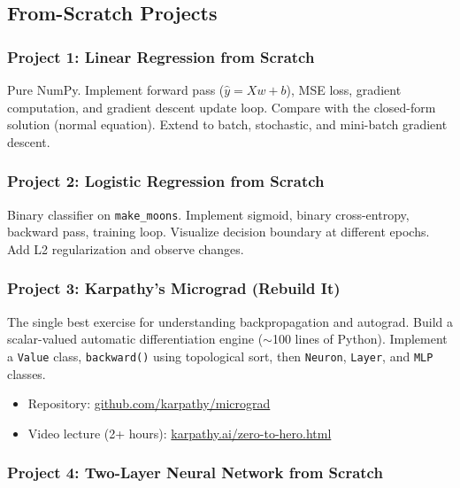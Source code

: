 \documentclass[11pt,letterpaper]{article}
\begin{document}
\subsection{From-Scratch Projects}

\subsubsection{Project 1: Linear Regression from Scratch}

Pure NumPy. Implement forward pass ($\hat{y} = Xw + b$), MSE loss, gradient computation, and gradient descent update loop. Compare with the closed-form solution (normal equation). Extend to batch, stochastic, and mini-batch gradient descent.

\subsubsection{Project 2: Logistic Regression from Scratch}

Binary classifier on \texttt{make\_moons}. Implement sigmoid, binary cross-entropy, backward pass, training loop. Visualize decision boundary at different epochs. Add L2 regularization and observe changes.

\subsubsection{Project 3: Karpathy's Micrograd (Rebuild It)}

The single best exercise for understanding backpropagation and autograd. Build a scalar-valued automatic differentiation engine ($\sim$100 lines of Python). Implement a \texttt{Value} class, \texttt{backward()} using topological sort, then \texttt{Neuron}, \texttt{Layer}, and \texttt{MLP} classes.

\begin{itemize}[nosep]
    \item Repository: \href{https://github.com/karpathy/micrograd}{github.com/karpathy/micrograd}
    \item Video lecture (2+ hours): \href{https://karpathy.ai/zero-to-hero.html}{karpathy.ai/zero-to-hero.html}
\end{itemize}

\subsubsection{Project 4: Two-Layer Neural Network from Scratch}
\end{document}
